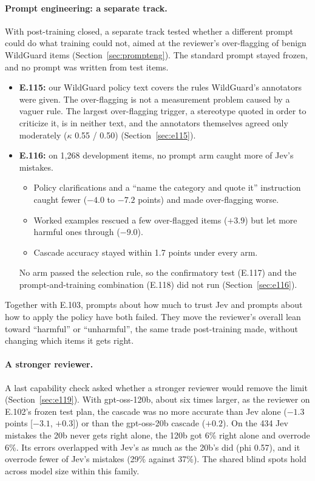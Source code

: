 \documentclass[11pt]{article}
\renewcommand{\_}{\origunderscore\allowbreak}
\begin{document}
\paragraph{Prompt engineering: a separate track.} With post-training closed, a separate track tested whether a different prompt could do what training could not, aimed at the reviewer's over-flagging of benign WildGuard items (Section~\ref{sec:prompteng}). The standard prompt stayed frozen, and no prompt was written from test items.
\begin{itemize}[leftmargin=*,itemsep=2pt]
  \item \textbf{E.115:} our WildGuard policy text covers the rules WildGuard's annotators were given. The over-flagging is not a measurement problem caused by a vaguer rule. The largest over-flagging trigger, a stereotype quoted in order to criticize it, is in neither text, and the annotators themselves agreed only moderately ($\kappa$ 0.55 / 0.50) (Section~\ref{sec:e115}).
  \item \textbf{E.116:} on 1{,}268 development items, no prompt arm caught more of Jev's mistakes.
  \begin{itemize}[itemsep=1pt]
    \item Policy clarifications and a ``name the category and quote it'' instruction caught fewer ($-4.0$ to $-7.2$ points) and made over-flagging worse.
    \item Worked examples rescued a few over-flagged items ($+3.9$) but let more harmful ones through ($-9.0$).
    \item Cascade accuracy stayed within 1.7 points under every arm.
  \end{itemize}
  No arm passed the selection rule, so the confirmatory test (E.117) and the prompt-and-training combination (E.118) did not run (Section~\ref{sec:e116}).
\end{itemize}
Together with E.103, prompts about how much to trust Jev and prompts about how to apply the policy have both failed. They move the reviewer's overall lean toward ``harmful'' or ``unharmful'', the same trade post-training made, without changing which items it gets right.

\paragraph{A stronger reviewer.} A last capability check asked whether a stronger reviewer would remove the limit (Section~\ref{sec:e119}). With gpt-oss-120b, about six times larger, as the reviewer on E.102's frozen test plan, the cascade was no more accurate than Jev alone ($-1.3$ points [$-3.1$, $+0.3$]) or than the gpt-oss-20b cascade ($+0.2$). On the 434 Jev mistakes the 20b never gets right alone, the 120b got 6\% right alone and overrode 6\%. Its errors overlapped with Jev's as much as the 20b's did (phi 0.57), and it overrode fewer of Jev's mistakes (29\% against 37\%). The shared blind spots hold across model size within this family.
\end{document}
